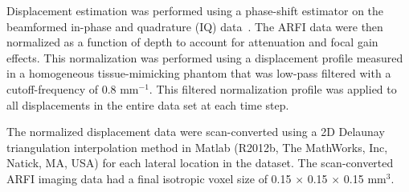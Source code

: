 

Displacement estimation was performed using a phase-shift estimator on the
beamformed in-phase and quadrature (IQ) data~\cite{Loupas95,pinton06}. The ARFI
data were then normalized as a function of depth to account for attenuation and
focal gain effects.  This normalization was performed using a displacement
profile measured in a homogeneous tissue-mimicking phantom that was low-pass
filtered with a cutoff-frequency of 0.8 mm$^{-1}$.  This filtered normalization
profile was applied to all displacements in the entire data set at each time
step.

The normalized displacement data were scan-converted using a 2D Delaunay
triangulation interpolation method in Matlab (R2012b, The MathWorks, Inc,
Natick, MA, USA) for each lateral location in the dataset.  The scan-converted
ARFI imaging data had a final isotropic voxel size of 0.15 $\times$ 0.15
$\times$ 0.15 mm$^3$.
